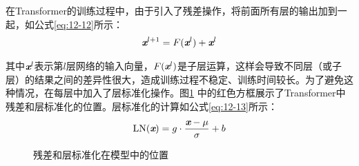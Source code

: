 
%



\parinterval 在Transformer的训练过程中，由于引入了残差操作，将前面所有层的输出加到一起，如公式\eqref{eq:12-12}所示：
\begin{eqnarray}
\textbf{\em x}^{l+1} = F (\textbf{\em x}^l) + \textbf{\em x}^l
\label{eq:12-12}
\end{eqnarray}

\noindent 其中$\textbf{\em x}^l$表示第$l$层网络的输入向量，$F (\textbf{\em x}^l)$是子层运算，这样会导致不同层（或子层）的结果之间的差异性很大，造成训练过程不稳定、训练时间较长。为了避免这种情况，在每层中加入了层标准化操作。图\ref{fig:12-14} 中的红色方框展示了Transformer中残差和层标准化的位置。层标准化的计算如公式\eqref{eq:12-13}所示：
\begin{eqnarray}
\textrm{LN}(\textbf{\em x}) = g \cdot \frac{\textbf{\em x}- \mu} {\sigma} + b
\label{eq:12-13}
\end{eqnarray}
\vspace{-2em}
\begin{figure}[htp]
\centering

\caption{残差和层标准化在模型中的位置}
\label{fig:12-14}
\end{figure}

